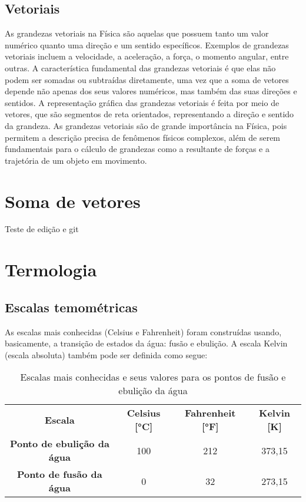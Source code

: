 \subsection{Vetoriais}
As grandezas vetoriais na Física são aquelas que possuem tanto um valor numérico quanto uma direção e um sentido específicos. Exemplos de grandezas vetoriais incluem a velocidade, a aceleração, a força, o momento angular, entre outras. A característica fundamental das grandezas vetoriais é que elas não podem ser somadas ou subtraídas diretamente, uma vez que a soma de vetores depende não apenas dos seus valores numéricos, mas também das suas direções e sentidos. A representação gráfica das grandezas vetoriais é feita por meio de vetores, que são segmentos de reta orientados, representando a direção e sentido da grandeza. As grandezas vetoriais são de grande importância na Física, pois permitem a descrição precisa de fenômenos físicos complexos, além de serem fundamentais para o cálculo de grandezas como a resultante de forças e a trajetória de um objeto em movimento.


\section{Soma de vetores}
Teste de edição e git





\section{Termologia}
\subsection{Escalas temométricas}
As escalas mais conhecidas (Celsius e Fahrenheit) foram construídas usando, basicamente, a transição de estados da água: fusão e ebulição. A escala Kelvin (escala absoluta) também pode ser definida como segue:

\begin{table}[!h]
    \centering
    \caption{Escalas mais conhecidas e seus valores para os pontos de fusão e ebulição da água}
    \vspace{.5cm}
    \label{tab:my-table}
    \begin{tabular}{cccc}
    \textbf{Escala}                    & \textbf{Celsius {[}°C{]}} & \textbf{Fahrenheit {[}°F{]}} & \textbf{Kelvin {[}K{]}} \\
    \textbf{Ponto de ebulição da água} & 100                       & 212                          & 373,15                  \\
    \textbf{Ponto de fusão da água}    & 0                         & 32                           & 273,15                 
    \end{tabular}
\end{table}



